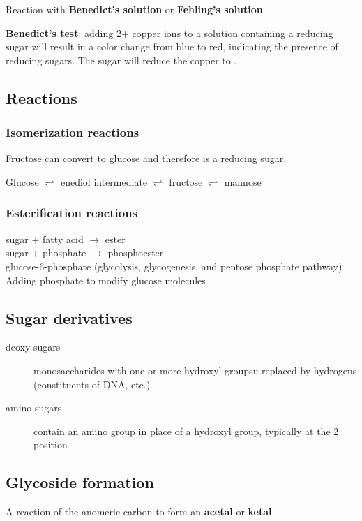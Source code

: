 \documentclass[letterpaper, 12pt]{article}
\begin{document}
Reaction with \textbf{Benedict's solution} or \textbf{Fehling's solution}

\textbf{Benedict's test}: adding 2+ copper ions to a solution containing a reducing sugar will result in a color change from blue to red, indicating the presence of reducing sugars. The sugar will reduce the copper to .

\subsection*{Reactions}

\subsubsection*{Isomerization reactions}
Fructose can convert to glucose and therefore is a reducing sugar.

Glucose $\rightleftharpoons$ enediol intermediate $\rightleftharpoons$ fructose $\rightleftharpoons$ mannose

\subsubsection*{Esterification reactions}

sugar + fatty acid $\to$ ester \\
sugar + phosphate $\to$ phosphoester \\
glucose-6-phosphate (glycolysis, glycogenesis, and pentose phosphate pathway) \\

Adding phosphate to modify glucose molecules

\subsection*{Sugar derivatives}

\begin{description}
\item [deoxy sugars] monosaccharides with one or more hydroxyl groupsu replaced by hydrogens (constituents of DNA, etc.)
\item [amino sugars] contain an amino group in place of a hydroxyl group, typically at the 2 position
\end{description}

\subsection*{Glycoside formation}
A reaction of the anomeric carbon to form an \textbf{acetal} or \textbf{ketal}
\end{document}
